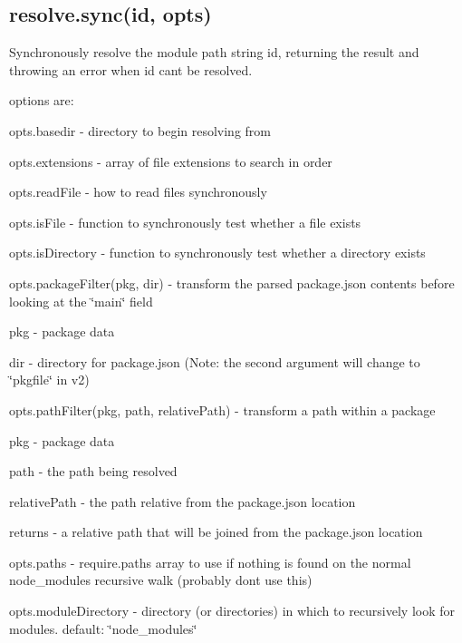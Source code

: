 \subsection*{resolve.\+sync(id, opts)}

Synchronously resolve the module path string {\ttfamily id}, returning the result and throwing an error when {\ttfamily id} can\textquotesingle{}t be resolved.

options are\+:


\begin{DoxyItemize}
\item opts.\+basedir -\/ directory to begin resolving from
\item opts.\+extensions -\/ array of file extensions to search in order
\item opts.\+read\+File -\/ how to read files synchronously
\item opts.\+is\+File -\/ function to synchronously test whether a file exists
\item opts.\+is\+Directory -\/ function to synchronously test whether a directory exists
\item {\ttfamily opts.\+package\+Filter(pkg, dir)} -\/ transform the parsed package.\+json contents before looking at the \char`\"{}main\char`\"{} field
\begin{DoxyItemize}
\item pkg -\/ package data
\item dir -\/ directory for package.\+json (Note\+: the second argument will change to \char`\"{}pkgfile\char`\"{} in v2)
\end{DoxyItemize}
\item {\ttfamily opts.\+path\+Filter(pkg, path, relative\+Path)} -\/ transform a path within a package
\begin{DoxyItemize}
\item pkg -\/ package data
\item path -\/ the path being resolved
\item relative\+Path -\/ the path relative from the package.\+json location
\item returns -\/ a relative path that will be joined from the package.\+json location
\end{DoxyItemize}
\item opts.\+paths -\/ require.\+paths array to use if nothing is found on the normal {\ttfamily node\+\_\+modules} recursive walk (probably don\textquotesingle{}t use this)
\item opts.\+module\+Directory -\/ directory (or directories) in which to recursively look for modules. default\+: {\ttfamily \char`\"{}node\+\_\+modules\char`\"{}}

\end{DoxyItemize}
